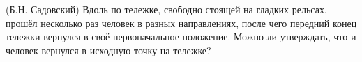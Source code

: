 (Б.Н. Садовский)
Вдоль по тележке, свободно стоящей на гладких рельсах, прошёл несколько
раз человек в разных направлениях, после чего передний конец тележки
вернулся в своё первоначальное положение. Можно ли утверждать, что и
человек вернулся в исходную точку на тележке?

